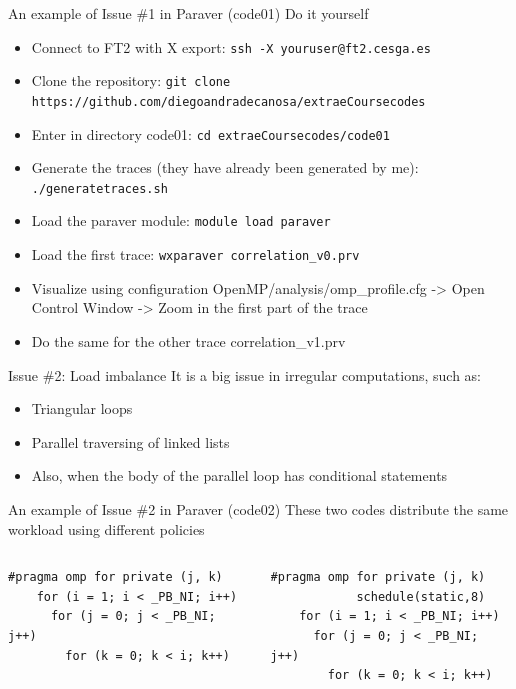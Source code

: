 \documentclass[10pt,xcolor=table]{beamer}
\begin{document}
\begin{frame}{An example of Issue \#1 in Paraver (code01)}
Do it yourself
\begin{itemize}
    \item Connect to FT2 with X export: {\tt ssh -X youruser@ft2.cesga.es}
    \item Clone the repository: {\tt git clone https://github.com/diegoandradecanosa/extraeCoursecodes}
    \item Enter in directory code01: {\tt cd extraeCoursecodes/code01}
    \item Generate the traces (they have already been generated by me): {\tt ./generatetraces.sh}
    \item Load the paraver module:  {\tt module load paraver}
    \item Load the first trace: {\tt wxparaver correlation\_v0.prv}
    \item Visualize using configuration OpenMP/analysis/omp\_profile.cfg -> Open Control Window -> Zoom in the first part of the trace
    \item Do the same for the other trace correlation\_v1.prv
\end{itemize}
\end{frame}

\begin{frame}{Issue \#2: Load imbalance}
It is a big issue in irregular computations, such as:
\begin{itemize}
    \item Triangular loops
    \item Parallel traversing of linked lists
    \item Also, when the body of the parallel loop has conditional statements
\end{itemize}
\end{frame}

\begin{frame}[fragile]{An example of Issue \#2 in Paraver (code02)}
These two codes distribute the same workload using different policies
\begin{columns}
\begin{column}{0.5\textwidth}
\begin{lstlisting}[style=shell,basicstyle=\scriptsize\ttfamily,gobble=3,caption={Default scheduling}]
    #pragma omp for private (j, k)
    for (i = 1; i < _PB_NI; i++)
      for (j = 0; j < _PB_NI; j++)
        for (k = 0; k < i; k++)
  \end{lstlisting}
  \end{column}
\begin{column}{0.5\textwidth}
  \begin{lstlisting}[style=shell,gobble=3,basicstyle=\scriptsize\ttfamily,caption={Load-balance-aware scheduling}]
    #pragma omp for private (j, k) 
            schedule(static,8)
    for (i = 1; i < _PB_NI; i++)
      for (j = 0; j < _PB_NI; j++)
	    for (k = 0; k < i; k++)
  \end{lstlisting}
  \end{column}
  \end{columns}
\end{frame}
\end{document}
